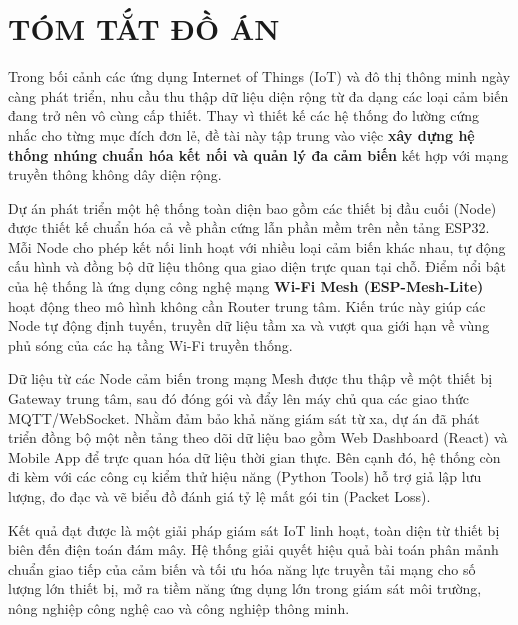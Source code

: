 \section*{TÓM TẮT ĐỒ ÁN}

Trong bối cảnh các ứng dụng Internet of Things (IoT) và đô thị thông minh ngày càng phát triển, nhu cầu thu thập dữ liệu diện rộng từ đa dạng các loại cảm biến đang trở nên vô cùng cấp thiết. Thay vì thiết kế các hệ thống đo lường cứng nhắc cho từng mục đích đơn lẻ, đề tài này tập trung vào việc \textbf{xây dựng hệ thống nhúng chuẩn hóa kết nối và quản lý đa cảm biến} kết hợp với mạng truyền thông không dây diện rộng.

Dự án phát triển một hệ thống toàn diện bao gồm các thiết bị đầu cuối (Node) được thiết kế chuẩn hóa cả về phần cứng lẫn phần mềm trên nền tảng ESP32. Mỗi Node cho phép kết nối linh hoạt với nhiều loại cảm biến khác nhau, tự động cấu hình và đồng bộ dữ liệu thông qua giao diện trực quan tại chỗ. Điểm nổi bật của hệ thống là ứng dụng công nghệ mạng \textbf{Wi-Fi Mesh (ESP-Mesh-Lite)} hoạt động theo mô hình không cần Router trung tâm. Kiến trúc này giúp các Node tự động định tuyến, truyền dữ liệu tầm xa và vượt qua giới hạn về vùng phủ sóng của các hạ tầng Wi-Fi truyền thống.

Dữ liệu từ các Node cảm biến trong mạng Mesh được thu thập về một thiết bị Gateway trung tâm, sau đó đóng gói và đẩy lên máy chủ qua các giao thức MQTT/WebSocket. Nhằm đảm bảo khả năng giám sát từ xa, dự án đã phát triển đồng bộ một nền tảng theo dõi dữ liệu bao gồm Web Dashboard (React) và Mobile App để trực quan hóa dữ liệu thời gian thực. Bên cạnh đó, hệ thống còn đi kèm với các công cụ kiểm thử hiệu năng (Python Tools) hỗ trợ giả lập lưu lượng, đo đạc và vẽ biểu đồ đánh giá tỷ lệ mất gói tin (Packet Loss).

Kết quả đạt được là một giải pháp giám sát IoT linh hoạt, toàn diện từ thiết bị biên đến điện toán đám mây. Hệ thống giải quyết hiệu quả bài toán phân mảnh chuẩn giao tiếp của cảm biến và tối ưu hóa năng lực truyền tải mạng cho số lượng lớn thiết bị, mở ra tiềm năng ứng dụng lớn trong giám sát môi trường, nông nghiệp công nghệ cao và công nghiệp thông minh.
\cleardoublepage